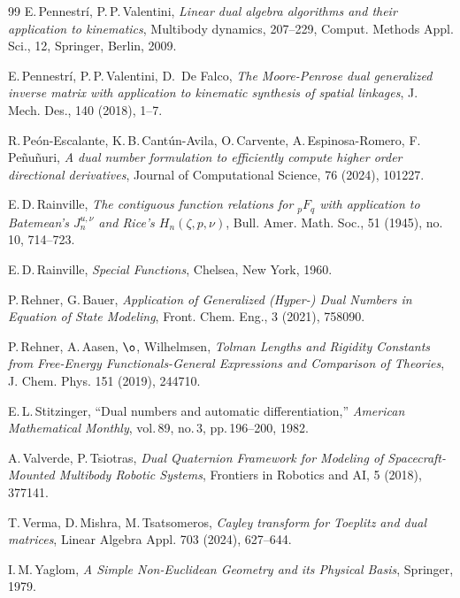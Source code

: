 \documentclass[11pt,a4paper,fleqn]{article}
\numberwithin{equation}{section}
\numberwithin{lemma}{section}
\numberwithin{theorem}{section}
\numberwithin{corollary}{section}
\begin{document}
\begin{thebibliography}{99}
 E.\,Pennestr{\'i}, P.\,P.\,Valentini,  \textit{Linear dual algebra algorithms and their application to kinematics}, Multibody dynamics, 207--229, Comput. Methods Appl. Sci., 12, Springer, Berlin, 2009.

 E.\,Pennestr{\'i}, P.\,P.\,Valentini, D.\, De Falco, \textit{The Moore-Penrose dual generalized inverse matrix with application to kinematic synthesis of spatial linkages}, J. Mech. Des., 140 (2018), 1--7. 

 R.\,Pe\'on-Escalante, K.\,B.\,Cant\'un-Avila, O.\,Carvente, A.\,Espinosa-Romero, F.\,Pe\~nu\~nuri, \textit{A dual number formulation to efficiently compute higher order directional derivatives}, Journal of Computational Science, 76 (2024), 101227.

 E.\,D.\,Rainville, \textit{The contiguous function relations for $_p F_q$ with application to Batemean's $J_n ^{u,\nu }$ and Rice's $H_n \left( {\zeta ,p,\nu } \right)$}, Bull. Amer. Math. Soc., 51 (1945), no. 10, 714--723.

 E.\,D.\,Rainville, \emph{Special Functions}, Chelsea, New York, 1960.

 P.\,Rehner, G.\,Bauer,   \textit{Application of Generalized (Hyper-) Dual Numbers in Equation of State Modeling}, Front. Chem. Eng., 3 (2021), 758090.

 P.\,Rehner, A.\,Aasen, $\o$, Wilhelmsen,  \textit{Tolman Lengths and Rigidity Constants from Free-Energy Functionals-General Expressions and Comparison of Theories}, J. Chem. Phys. 151 (2019), 244710. %

%
%

 E.\,L.\,Stitzinger, “Dual numbers and automatic differentiation,” \textit{American Mathematical Monthly}, vol.\,89, no.\,3, pp.\,196--200, 1982.

 A.\,Valverde, P.\,Tsiotras,  \textit{ Dual Quaternion Framework for Modeling of Spacecraft-Mounted Multibody Robotic Systems}, Frontiers in Robotics and AI, 5 (2018), 377141.%

 T.\,Verma, D.\,Mishra, M.\,Tsatsomeros, \textit{Cayley transform for Toeplitz and dual matrices}, Linear Algebra Appl. 703 (2024), 627--644.

 I.\,M.\,Yaglom,  \textit{A Simple Non-Euclidean Geometry and its Physical Basis}, Springer, 1979.
		
\end{thebibliography}
	
\end{document}
